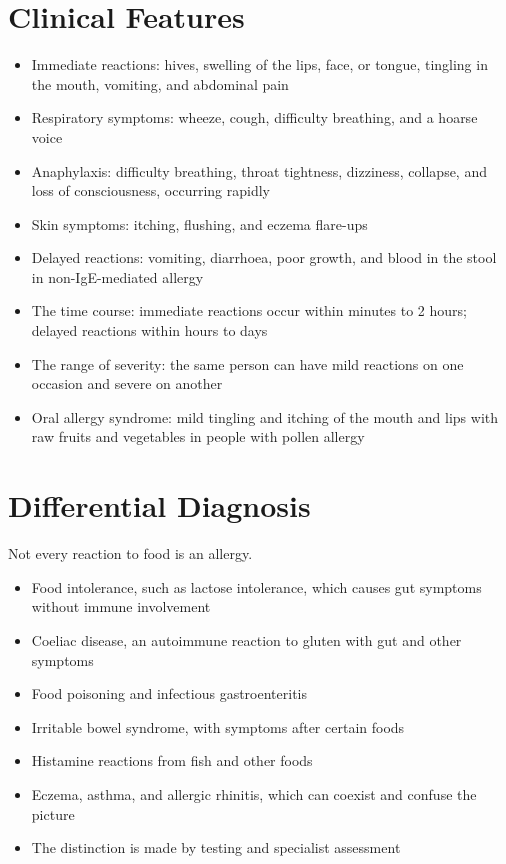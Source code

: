 \section*{Clinical Features}
\begin{itemize}
    \item Immediate reactions: hives, swelling of the lips, face, or tongue, tingling in the mouth, vomiting, and abdominal pain
    \item Respiratory symptoms: wheeze, cough, difficulty breathing, and a hoarse voice
    \item Anaphylaxis: difficulty breathing, throat tightness, dizziness, collapse, and loss of consciousness, occurring rapidly
    \item Skin symptoms: itching, flushing, and eczema flare-ups
    \item Delayed reactions: vomiting, diarrhoea, poor growth, and blood in the stool in non-IgE-mediated allergy
    \item The time course: immediate reactions occur within minutes to 2 hours; delayed reactions within hours to days
    \item The range of severity: the same person can have mild reactions on one occasion and severe on another
    \item Oral allergy syndrome: mild tingling and itching of the mouth and lips with raw fruits and vegetables in people with pollen allergy
\end{itemize}

\section*{Differential Diagnosis}
Not every reaction to food is an allergy.
\begin{itemize}
    \item Food intolerance, such as lactose intolerance, which causes gut symptoms without immune involvement
    \item Coeliac disease, an autoimmune reaction to gluten with gut and other symptoms
    \item Food poisoning and infectious gastroenteritis
    \item Irritable bowel syndrome, with symptoms after certain foods
    \item Histamine reactions from fish and other foods
    \item Eczema, asthma, and allergic rhinitis, which can coexist and confuse the picture
    \item The distinction is made by testing and specialist assessment
\end{itemize}

